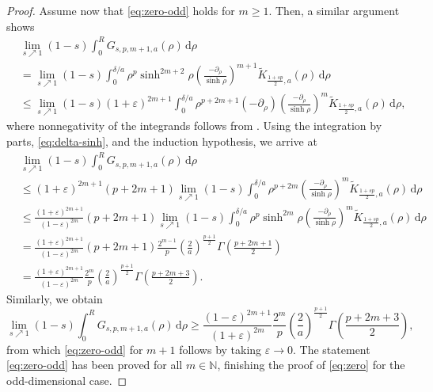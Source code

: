 \documentclass[11pt]{amsart}
\theoremstyle{plain}
\theoremstyle{definition}
\numberwithin{equation}{section}
\begin{document}
\begin{proof}
Assume now that \eqref{eq:zero-odd} holds for $m \geq 1$. Then, a similar argument shows
\begin{equation*}
\begin{split}
&\lim_{s \nearrow 1} (1-s) \int_{0}^{R} G_{s, p, m+1, a}(\rho) \, \mathrm{d}\rho \\
&= \lim_{s \nearrow 1} (1-s) \int_{0}^{\delta/a} \rho^{p} \sinh^{2m+2} \rho \left( \frac{-\partial_{\rho}}{\sinh \rho} \right)^{m+1} \widetilde{K}_{\frac{1+sp}{2},a}(\rho) \, \mathrm{d}\rho \\
&\leq \lim_{s \nearrow 1} (1-s)(1+\varepsilon)^{2m+1} \int_{0}^{\delta/a} \rho^{p+2m+1}(-\partial_\rho) \left( \frac{-\partial_{\rho}}{\sinh \rho} \right)^{m} \widetilde{K}_{\frac{1+sp}{2},a}(\rho) \, \mathrm{d}\rho,
\end{split}
\end{equation*}
where nonnegativity of the integrands follows from . Using the integration by parts, \eqref{eq:delta-sinh}, and the induction hypothesis, we arrive at
\begin{equation*}
\begin{split}
&\lim_{s \nearrow 1} (1-s) \int_{0}^{R} G_{s, p, m+1, a}(\rho) \, \mathrm{d}\rho \\
&\leq (1+\varepsilon)^{2m+1} (p+2m+1) \lim_{s \nearrow 1} (1-s) \int_{0}^{\delta/a} \rho^{p+2m} \left( \frac{-\partial_\rho}{\sinh \rho} \right)^{m} \widetilde{K}_{\frac{1+sp}{2},a}(\rho) \, \mathrm{d}\rho \\
&\leq \frac{(1+\varepsilon)^{2m+1}}{(1-\varepsilon)^{2m}} (p+2m+1) \lim_{s \nearrow 1} (1-s) \int_{0}^{\delta/a} \rho^{p} \sinh^{2m}\rho \left( \frac{-\partial_\rho}{\sinh \rho} \right)^{m} \widetilde{K}_{\frac{1+sp}{2},a}(\rho) \, \mathrm{d}\rho \\
&= \frac{(1+\varepsilon)^{2m+1}}{(1-\varepsilon)^{2m}} (p+2m+1) \frac{2^{m-1}}{p} \left( \frac{2}{a} \right)^{\frac{p+1}{2}} \Gamma\left( \frac{p+2m+1}{2} \right) \\
&= \frac{(1+\varepsilon)^{2m+1}}{(1-\varepsilon)^{2m}} \frac{2^{m}}{p} \left( \frac{2}{a} \right)^{\frac{p+1}{2}} \Gamma\left( \frac{p+2m+3}{2} \right).
\end{split}
\end{equation*}
Similarly, we obtain
\begin{equation*}
\lim_{s \nearrow 1} (1-s) \int_{0}^{R} G_{s, p, m+1, a}(\rho) \, \mathrm{d}\rho \geq \frac{(1-\varepsilon)^{2m+1}}{(1+\varepsilon)^{2m}} \frac{2^{m}}{p} \left( \frac{2}{a} \right)^{\frac{p+1}{2}} \Gamma\left( \frac{p+2m+3}{2} \right),
\end{equation*}
from which \eqref{eq:zero-odd} for $m+1$ follows by taking $\varepsilon \to 0$. The statement \eqref{eq:zero-odd} has been proved for all $m \in \mathbb{N}$, finishing the proof of \eqref{eq:zero} for the odd-dimensional case.


\end{proof}
\end{document}
